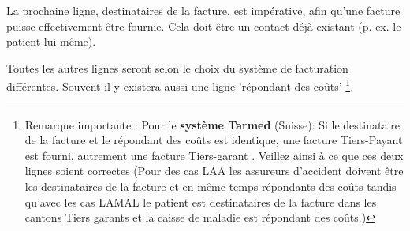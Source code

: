 La prochaine ligne, destinataires de la facture, est impérative, afin qu'une facture puisse effectivement être fournie. Cela doit être un contact déjà existant (p. ex. le patient lui-même).

\medskip
Toutes les autres lignes seront selon le choix du système de facturation différentes. Souvent il y existera aussi une ligne 'répondant des coûts' \footnote{Remarque importante : Pour le \textbf{système Tarmed } (Suisse): Si le destinataire de la facture et le répondant des coûts est identique, une facture Tiers-Payant est fourni, autrement une facture Tiers-garant . Veillez ainsi à ce que ces deux lignes soient correctes (Pour des cas LAA les assureurs d'accident doivent être les destinataires de la facture et en même temps répondants des coûts tandis qu'avec les cas LAMAL le patient est destinataires de la facture dans les cantons Tiers garants et la caisse de maladie est répondant des coûts.)}.

\clearpage

